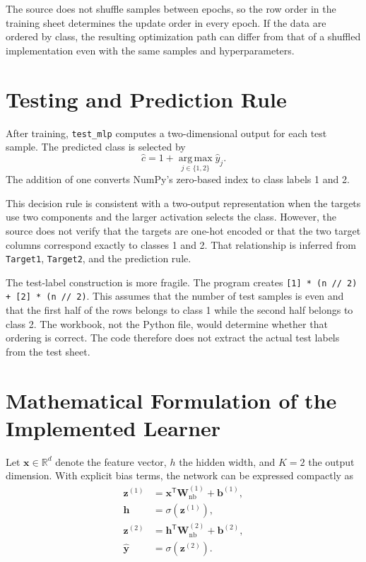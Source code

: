 \documentclass[11pt,a4paper]{article}
\newcommand{\code}[1]{\texttt{\small #1}}
\begin{document}
The source does not shuffle samples between epochs, so the row order in the training sheet determines the update order in every epoch. If the data are ordered by class, the resulting optimization path can differ from that of a shuffled implementation even with the same samples and hyperparameters.

\section{Testing and Prediction Rule}
After training, \code{test\_mlp} computes a two-dimensional output for each test sample. The predicted class is selected by
\begin{equation}
\hat{c}=1+\operatorname*{arg\,max}_{j\in\{1,2\}} \hat{y}_j.
\end{equation}
The addition of one converts NumPy's zero-based index to class labels 1 and 2.

This decision rule is consistent with a two-output representation when the targets use two components and the larger activation selects the class. However, the source does not verify that the targets are one-hot encoded or that the two target columns correspond exactly to classes 1 and 2. That relationship is inferred from \code{Target1}, \code{Target2}, and the prediction rule.

The test-label construction is more fragile. The program creates
\code{[1] * (n // 2) + [2] * (n // 2)}.
This assumes that the number of test samples is even and that the first half of the rows belongs to class 1 while the second half belongs to class 2. The workbook, not the Python file, would determine whether that ordering is correct. The code therefore does not extract the actual test labels from the test sheet.

\section{Mathematical Formulation of the Implemented Learner}
Let \(\mathbf{x}\in\mathbb{R}^{d}\) denote the feature vector, \(h\) the hidden width, and \(K=2\) the output dimension. With explicit bias terms, the network can be expressed compactly as
\begin{align}
\mathbf{z}^{(1)} &= \mathbf{x}^{\mathsf T}\mathbf{W}^{(1)}_{\mathrm{nb}} + \mathbf{b}^{(1)},\\
\mathbf{h} &= \sigma(\mathbf{z}^{(1)}),\\
\mathbf{z}^{(2)} &= \mathbf{h}^{\mathsf T}\mathbf{W}^{(2)}_{\mathrm{nb}} + \mathbf{b}^{(2)},\\
\hat{\mathbf{y}} &= \sigma(\mathbf{z}^{(2)}).
\end{align}
\end{document}
